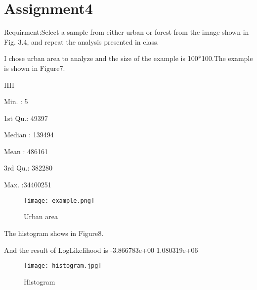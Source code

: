 \documentclass{article}
\begin{document}
	\maketitle
	\section{Assignment4}
	Requirment:Select a sample from either urban or forest from the image shown in Fig. 3.4, and repeat the analysis presented in class. 
	
	I chose urban area to analyze and the size of the example is 100*100.The example is shown in Figure7.
	
	\hspace{1cm}HH
	                 
	Min.   :       5  
	
	1st Qu.:   49397  
	
	Median :  139494  
	
	Mean   :  486161  
	
	3rd Qu.:  382280  
	
	Max.   :34400251  
	
	\begin{figure}[ht]
		\centering
		\texttt{[image: example.png]}
		\caption{Urban area}
		\label{fig7}
	\end{figure}
	
	The histogram shows in Figure8.
	
	And the result of  LogLikelihood is -3.866783e+00  1.080319e+06
	
	\begin{figure}[ht]
		\centering
		\texttt{[image: histogram.jpg]}
		\caption{Histogram}
		\label{fig8}
	\end{figure}
\end{document}
